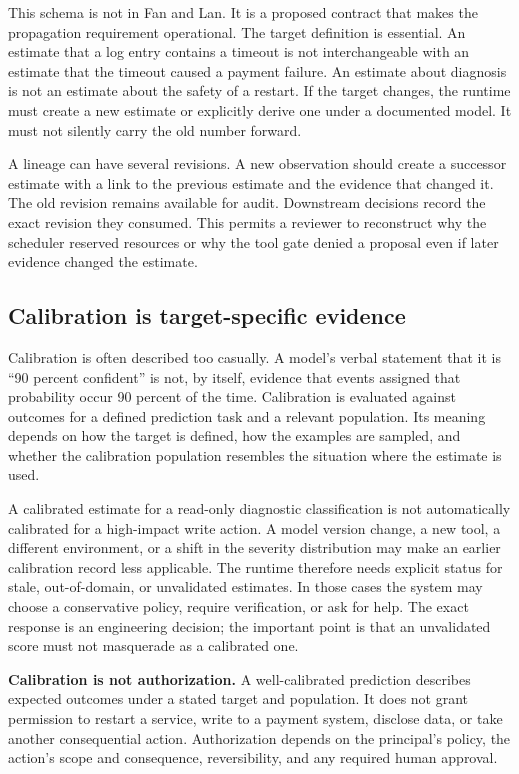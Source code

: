 This schema is not in Fan and Lan. It is a proposed contract that makes the propagation requirement operational. The target definition is essential. An estimate that a log entry contains a timeout is not interchangeable with an estimate that the timeout caused a payment failure. An estimate about diagnosis is not an estimate about the safety of a restart. If the target changes, the runtime must create a new estimate or explicitly derive one under a documented model. It must not silently carry the old number forward.

A lineage can have several revisions. A new observation should create a successor estimate with a link to the previous estimate and the evidence that changed it. The old revision remains available for audit. Downstream decisions record the exact revision they consumed. This permits a reviewer to reconstruct why the scheduler reserved resources or why the tool gate denied a proposal even if later evidence changed the estimate.

\subsection{Calibration is target-specific evidence}
\label{sec:ch16-calibration}

Calibration is often described too casually. A model's verbal statement that it is ``90 percent confident'' is not, by itself, evidence that events assigned that probability occur 90 percent of the time. Calibration is evaluated against outcomes for a defined prediction task and a relevant population. Its meaning depends on how the target is defined, how the examples are sampled, and whether the calibration population resembles the situation where the estimate is used.

A calibrated estimate for a read-only diagnostic classification is not automatically calibrated for a high-impact write action. A model version change, a new tool, a different environment, or a shift in the severity distribution may make an earlier calibration record less applicable. The runtime therefore needs explicit status for stale, out-of-domain, or unvalidated estimates. In those cases the system may choose a conservative policy, require verification, or ask for help. The exact response is an engineering decision; the important point is that an unvalidated score must not masquerade as a calibrated one.

\begin{warningbox}
\textbf{Calibration is not authorization.} A well-calibrated prediction describes expected outcomes under a stated target and population. It does not grant permission to restart a service, write to a payment system, disclose data, or take another consequential action. Authorization depends on the principal's policy, the action's scope and consequence, reversibility, and any required human approval.
\end{warningbox}

